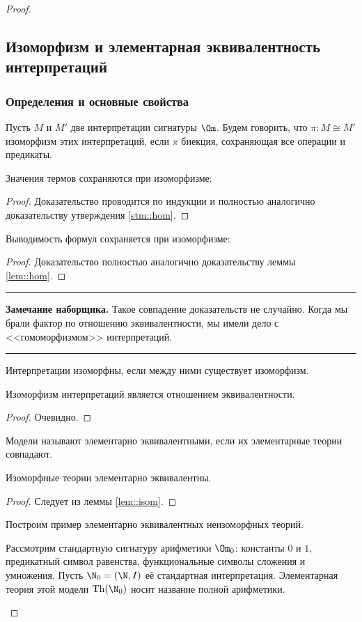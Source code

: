 \documentclass[a4paper,draft]{article}
\newenvironment{nbb}{\par\vskip3pt\hrule\vskip3pt\textbf{\footnotesize Замечание наборщика.}\footnotesize }
{\vskip3pt\hrule\par\vskip3pt}
\DeclareMathOperator{\Th}{Th}
\begin{document}
\begin{proof}
\subsection{Изоморфизм и элементарная эквивалентность интерпретаций}
\subsubsection{Определения и основные свойства}
\begin{df}
Пусть $M$ и $M'$ две интерпретации сигнатуры $\Om$.
Будем говорить, что $\pi:M\cong M'$ изоморфизм этих интерпретаций,
если $\pi$ биекция, сохраняющая все операции и предикаты.
\end{df}
\begin{lemma}
Значения термов сохраняются при изоморфизме:
\end{lemma}
\begin{proof}
Доказательство проводится по индукции и полностью аналогично доказательству утверждения \ref{stm::hom}.
\end{proof}
\begin{lemma}
\label{lem::isom}
Выводимость формул сохраняется при изоморфизме:
\end{lemma}
\begin{proof}
Доказательство полностью аналогично доказательству леммы \ref{lem::hom}.
\end{proof}
\begin{nbb}
Такое совпадение доказательств не случайно. Когда мы брали фактор по отношению эквивалентности, мы имели
дело с <<гомоморфизмом>> интерпретаций.
\end{nbb}
\begin{df}
Интерпретации изоморфны, если между ними существует изоморфизм.
\end{df}
\begin{stm}
Изоморфизм интерпретаций является отношением эквивалентности.
\end{stm}
\begin{proof}
Очевидно.
\end{proof}
\begin{df}
Модели называют элементарно эквивалентными, если их элементарные теории совпадают.
\end{df}
\begin{theorem}
Изоморфные теории элементарно эквивалентны.
\end{theorem}
\begin{proof}
Следует из леммы \ref{lem::isom}.
\end{proof}
Построим пример элементарно эквивалентных неизоморфных теорий.
\begin{ex}
Рассмотрим стандартную сигнатуру арифметики $\Om_0$: константы $0$ и $1$, предикатный символ равенства,
функциональные символы сложения и умножения. Пусть $\N_0=(\N,I)$ её стандартная интерпретация.
Элементарная теория этой модели $\Th(\N_0)$ носит название полной арифметики.


\end{ex}
\end{proof}
\end{document}
